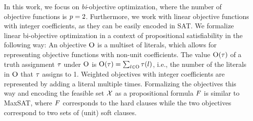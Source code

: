 In this work, we focus on \emph{bi}-objective optimization, where the number of objective functions is $p=2$.
Furthermore, we work with linear objective functions with integer coefficients, as they can be easily encoded in SAT.
We formalize linear bi-objective optimization in a context of propositional satisfiability in the following way:
An objective $\textsc{O}$ is a multiset of literals, which allows for representing objective functions with non-unit coefficients.
The value $\textsc{O}(\tau)$ of a truth assignment $\tau$ under $\textsc{O}$ is $\textsc{O}(\tau) = \sum_{l \in \textsc{O}} \tau(l)$, i.e., the number of the literals in $\textsc{O}$ that $\tau$ assigns to 1. 
Weighted objectives with integer coefficients are represented by adding a literal multiple times.
Formalizing the objectives this way and encoding the feasible set $\mathcal{X}$ as a propositional formula $F$ is similar to MaxSAT, where $F$ corresponds to the hard clauses while the two objectives correspond to two sets of (unit) soft clauses.


